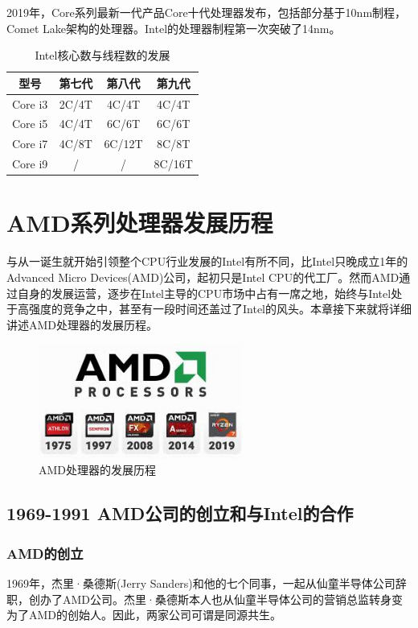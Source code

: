 \documentclass[UTF8]{ctexart}
\begin{document}
2019年，Core系列最新一代产品Core十代处理器发布，包括部分基于10nm制程，Comet Lake架构的处理器。Intel的处理器制程第一次突破了14nm。
\begin{table}[H]
    \centering
    \caption{Intel核心数与线程数的发展}
    \begin{tabular}{cccc}
        \toprule
        型号    & 第七代 & 第八代 & 第九代 \\
        \midrule
        Core i3 & 2C/4T  & 4C/4T  & 4C/4T  \\
        Core i5 & 4C/4T  & 6C/6T  & 6C/6T  \\
        Core i7 & 4C/8T  & 6C/12T & 8C/8T  \\
        Core i9 & /      & /      & 8C/16T \\
        \bottomrule
    \end{tabular}
\end{table}
\newpage



\section{AMD系列处理器发展历程}
与从一诞生就开始引领整个CPU行业发展的Intel有所不同，比Intel只晚成立1年的Advanced Micro Devices(AMD)公司，起初只是Intel CPU的代工厂。然而AMD通过自身的发展运营，逐步在Intel主导的CPU市场中占有一席之地，始终与Intel处于高强度的竞争之中，甚至有一段时间还盖过了Intel的风头。本章接下来就将详细讲述AMD处理器的发展历程。
\begin{figure}[H]
    \begin{center}
        \includegraphics[width=0.6\textwidth]{figure/AMDdev.jpg}
        \caption{AMD处理器的发展历程}
    \end{center}
\end{figure}

\subsection{1969-1991 AMD公司的创立和与Intel的合作}
\subsubsection{AMD的创立}
1969年，杰里·桑德斯(Jerry Sanders)和他的七个同事，一起从仙童半导体公司辞职，创办了AMD公司。杰里·桑德斯本人也从仙童半导体公司的营销总监转身变为了AMD的创始人。因此，两家公司可谓是同源共生。
\end{document}
